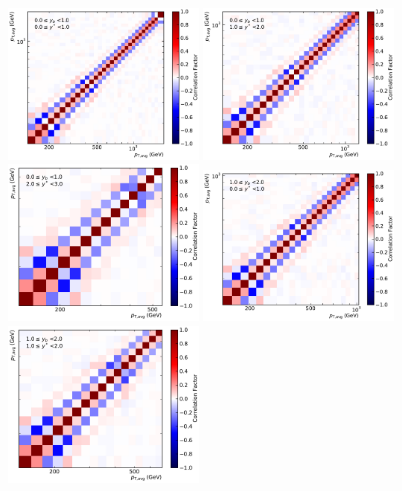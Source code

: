 \begin{figure}[htbp]
    \centering
    \includegraphics[width=0.45\textwidth]{figures/measurement/unf_nlo_corr_yb0ys0.pdf}\hfill
    \includegraphics[width=0.45\textwidth]{figures/measurement/unf_nlo_corr_yb0ys1.pdf}
    \includegraphics[width=0.45\textwidth]{figures/measurement/unf_nlo_corr_yb0ys2.pdf}\hfill
    \includegraphics[width=0.45\textwidth]{figures/measurement/unf_nlo_corr_yb1ys0.pdf}
    \includegraphics[width=0.45\textwidth]{figures/measurement/unf_nlo_corr_yb1ys1.pdf}\hfill

\end{figure}
